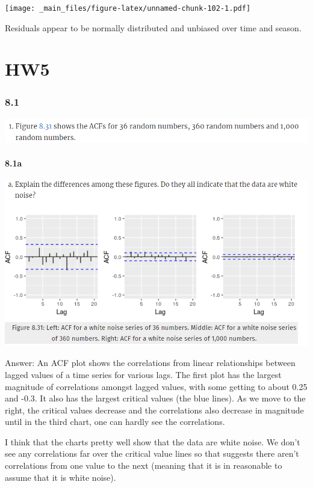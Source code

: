 \documentclass[]{book}
\begin{document}
\texttt{[image: \_main\_files/figure-latex/unnamed-chunk-102-1.pdf]}

Residuals appear to be normally distributed and unbiased over time and season.

\hypertarget{hw5}{%
\chapter{HW5}\label{hw5}}

\hypertarget{section-12}{%
\subsection{8.1}\label{section-12}}

\includegraphics{./week5/8.png}

\hypertarget{a-7}{%
\subsubsection{8.1a}\label{a-7}}

\includegraphics{./week5/8.1a.png}

Answer: An ACF plot shows the correlations from linear relationships between lagged values of a time series for various lags. The first plot has the largest magnitude of correlations amongst lagged values, with some getting to about 0.25 and -0.3. It also has the largest critical values (the blue lines). As we move to the right, the critical values decrease and the correlations also decrease in magnitude until in the third chart, one can hardly see the correlations.

I think that the charts pretty well show that the data are white noise. We don't see any correlations far over the critical value lines so that suggests there aren't correlations from one value to the next (meaning that it is in reasonable to assume that it is white noise).
\end{document}
